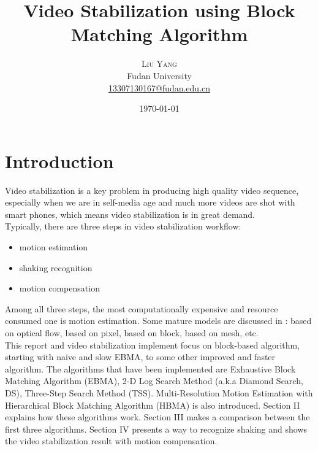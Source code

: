 \documentclass[a4paper, twocolumn]{article}
\title{Video Stabilization using Block Matching Algorithm} %
\author{%
	\textsc{Liu Yang} \\[1ex] %
	\normalsize Fudan University \\ %
	\normalsize \href{mailto:13307130167@fudan.edu.cn}{13307130167@fudan.edu.cn} %
}
\date{\today} %
\begin{document}
	
	\maketitle
	
	\section{Introduction}
	
	\lettrine[nindent=0em,lines=3]{V} ideo stabilization is a key problem in producing high quality video sequence, especially when we are in self-media age and much more videos are shot with smart phones, which means video stabilization is in great demand. \\
	Typically, there are three steps in video stabilization workflow: 
	
	\begin{itemize}
		\item motion estimation
		\item shaking recognition
		\item motion compensation
	\end{itemize}
	\noindent
	Among all three steps, the most computationally expensive and resource consumed one is motion estimation. Some mature models are discussed in \cite{vpc}: based on optical flow, based on pixel, based on block, based on mesh, etc. \\
	This report and video stabilization implement focus on block-based algorithm, starting with naive and slow EBMA, to some other improved and faster algorithm. The algorithms that have been implemented are Exhaustive Block Matching Algorithm (EBMA), 2-D Log Search Method (a.k.a Diamond Search, DS), Three-Step Search Method (TSS). Multi-Resolution Motion Estimation with Hierarchical Block Matching Algorithm (HBMA) is also introduced. Section II explains how these algorithms work. Section III makes a comparison between the first three algorithms. Section IV presents a way to recognize shaking and shows the video stabilization result with motion compensation.
	
	
\end{document}
